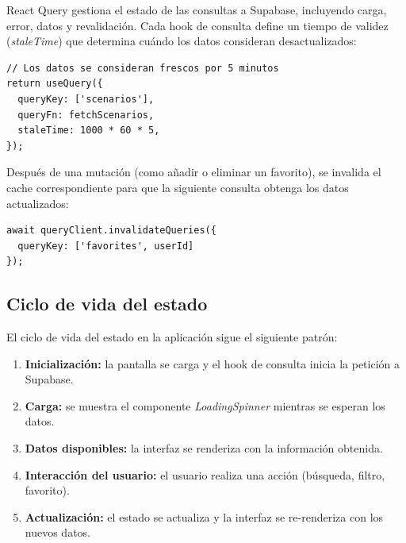 React Query gestiona el estado de las consultas a Supabase, incluyendo
carga, error, datos y revalidaci\'on. Cada hook de consulta define un
tiempo de validez (\textit{staleTime}) que determina cu\'ando los datos
consideran desactualizados:

\begin{lstlisting}
// Los datos se consideran frescos por 5 minutos
return useQuery({
  queryKey: ['scenarios'],
  queryFn: fetchScenarios,
  staleTime: 1000 * 60 * 5,
});
\end{lstlisting}

Despu\'es de una mutaci\'on (como a\~nadir o eliminar un favorito), se
invalida el cache correspondiente para que la siguiente consulta obtenga
los datos actualizados:

\begin{lstlisting}
await queryClient.invalidateQueries({
  queryKey: ['favorites', userId]
});
\end{lstlisting}

\subsection{Ciclo de vida del estado}

El ciclo de vida del estado en la aplicaci\'on sigue el siguiente patr\'on:

\begin{enumerate}
  \item \textbf{Inicializaci\'on:} la pantalla se carga y el hook de
    consulta inicia la petici\'on a Supabase.
  \item \textbf{Carga:} se muestra el componente \textit{LoadingSpinner}
    mientras se esperan los datos.
  \item \textbf{Datos disponibles:} la interfaz se renderiza con la
    informaci\'on obtenida.
  \item \textbf{Interacci\'on del usuario:} el usuario realiza una acci\'on
    (b\'usqueda, filtro, favorito).
  \item \textbf{Actualizaci\'on:} el estado se actualiza y la interfaz
    se re-renderiza con los nuevos datos.
\end{enumerate}
